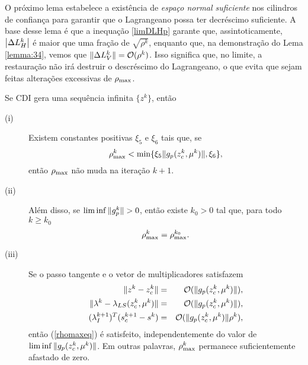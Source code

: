 O próximo lema estabelece a existência de \emph{espaço normal suficiente} nos
cilindros de confiança para garantir que o Lagrangeano possa ter decréscimo
suficiente. A base desse lema é que a inequação \eqref{limDLHp} garante que,
assintoticamente, $\left| \Delta L_H^k\right|$ é maior que uma fração de
$\sqrt{\rho^k}$, enquanto que, na demonstração do Lema \ref{lemma:34}, vemos que
$\Vert \Delta L_V^k\Vert = \mathcal{O}(\rho^k)$. Isso significa que, no limite, a
restauração não irá destruir o descréscimo do Lagrangeano, o que evita que sejam
feitas alterações excessivas de $\rho_{\max}$.  
\begin{lemma} 
  Se CDI gera uma
  sequ\^encia infinita $\{z^k\}$, ent\~ao 
\begin{description} 
  \item[(i)] Existem constantes positivas $\xi_5$ e $\xi_6$ tais que, se
\begin{equation}\visiblelbl{hip:limrhomax} 
  \rhomax^k < \min\{\xi_5\norma{g_p(\zc{k},\mu^k)},\xi_6\}, 
\end{equation}
    então $\rho_{\max}$ n\~ao muda na itera\c{c}\~ao $k + 1$.  
  \item[(ii)] Al\'em disso, se $\lim\inf \Vert g_p^{k}\Vert > 0$, ent\~ao existe
    $k_0 > 0$ tal que, para todo $k \geq k_0$
\begin{equation}\visiblelbl{rhomaxeq} 
  \rhomax^k = \rhomax^{k_0}.
\end{equation}
  \item[(iii)] Se o passo tangente e o vetor de multiplicadores satisfazem
  \begin{eqnarray} 
    \norma{z^k - \zc{k}} & = & \bigo(\norma{g_p(\zc{k},\mu^k)})
      \visiblelbl{hip:difz}, \\ 
    \norma{\lk{k} - \lls(\zc{k},\mu^k)} & = & \bigo(\norma{g_p(\zc{k},\mu^k)})
      \visiblelbl{hip:difl}, \\ 
    (\lambda^{k+1}_I)^T(s_c^{k+1}-s^k) & = &
      \bigo(\norma{g_p(\zc{k},\mu^k)}\rho^k), \visiblelbl{hip:gap}
\end{eqnarray} 
    ent\~ao (\ref{rhomaxeq}) \'e satisfeito, independentemente do
    valor de $\lim\inf\Vert g_p(z_c^{k},\mu^k)\Vert$. Em outras palavras,
    $\rho_{\max}^k$ permanece suficientemente afastado de zero.  
  \end{description} 
\end{lemma}
